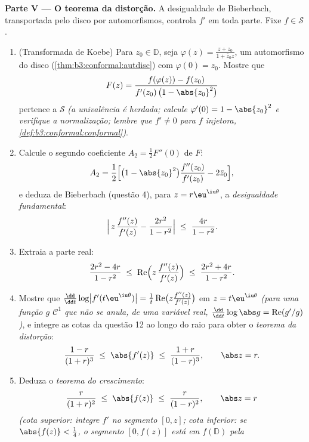 \begin{problem}
\medskip
\noindent\textbf{Parte V --- O teorema da distorção.} A desigualdade de
Bieberbach, transportada pelo disco por automorfismos, controla $f'$
em toda parte. Fixe $f \in \mathcal
S$.
\begin{enumerate}[resume]
  \item (Transformada de Koebe) Para $z_0 \in \mathbb D$, seja $\varphi(z) = \frac{z + z_0}{1 + \bar z_0z}$, um automorfismo
        do disco (\cref{thm:b3:conformal:autdisc}) com $\varphi(0) = z_0$. Mostre que
        \[
        F(z) = \frac{f(\varphi(z)) - f(z_0)}
        {f'(z_0)\,\bigl(1 - \abs{z_0}^2\bigr)}
        \]
        pertence a $\mathcal S$ \emph{(a univalência é herdada; calcule $\varphi'(0) = 1 - \abs{z_0}^2$ e
        verifique a normalização; lembre que $f' \neq 0$ para $f$ injetora,
        \cref{def:b3:conformal:conformal})}.
  \item Calcule o segundo coeficiente $A_2 = \frac12F''(0)$ de $F$:
        \[
        A_2 = \frac12\Bigl[\bigl(1 - \abs{z_0}^2\bigr)
        \frac{f''(z_0)}{f'(z_0)} - 2\bar z_0\Bigr] ,
        \]
        e deduza de Bieberbach (questão 4), para $z =
        r\eu^{\iu\theta}$, a
        \emph{desigualdade fundamental}:
        \[
        \Bigl|\,z\,\frac{f''(z)}{f'(z)} -
        \frac{2r^2}{1 - r^2}\Bigr|
        \;\leq\; \frac{4r}{1 - r^2} .
        \]
  \item Extraia a parte real:
        \[
        \frac{2r^2 - 4r}{1 - r^2} \;\leq\;
        \operatorname{Re}\Bigl(z\,\frac{f''(z)}{f'(z)}\Bigr)
        \;\leq\; \frac{2r^2 + 4r}{1 - r^2} .
        \]
  \item Mostre que $\frac{\dd}{\dd t}\log\bigl|
        f'(t\eu^{\iu\theta})\bigr| = \frac1t
        \operatorname{Re}\bigl(z\frac{f''(z)}{f'(z)}\bigr)$ em $z = t\eu^{\iu\theta}$ \emph{(para uma função $g$ $\mathcal C^1$
        que não se anula, de uma variável real, $\frac{\dd}{\dd t}\log\abs g =
        \operatorname{Re}(g'/g)$)}, e integre as
        cotas da questão 12 ao longo do raio para obter o \emph{teorema
        da distorção}:
        \[
        \frac{1 - r}{(1 + r)^3} \;\leq\; \abs{f'(z)}
        \;\leq\; \frac{1 + r}{(1 - r)^3},
        \qquad \abs z = r .
        \]
  \item Deduza o \emph{teorema do crescimento}:
        \[
        \frac{r}{(1 + r)^2} \;\leq\; \abs{f(z)} \;\leq\;
        \frac{r}{(1 - r)^2},
        \qquad \abs z = r
        \]
        \emph{(cota superior: integre $f'$ no segmento $[0, z]$;
        cota inferior: se $\abs{f(z)} < \frac14$, o segmento $[0, f(z)]$ está em $f(\mathbb D)$ pela
}
\end{enumerate}
\end{problem}

